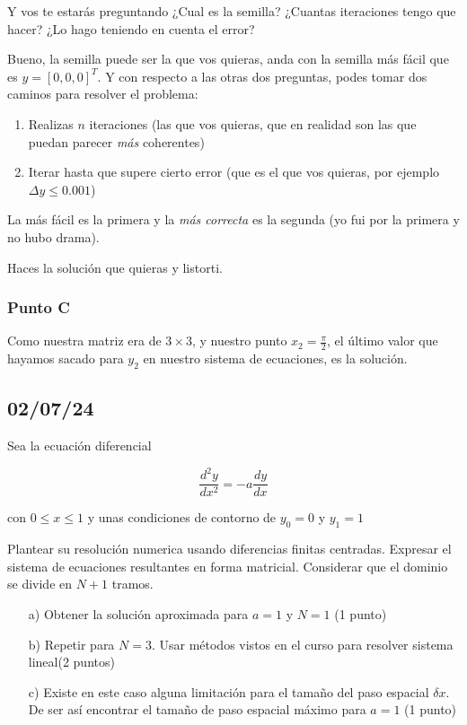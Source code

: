 Y vos te estarás preguntando ¿Cual es la semilla? ¿Cuantas iteraciones tengo que hacer? ¿Lo hago teniendo en cuenta el error? 

Bueno, la semilla puede ser la que vos quieras, anda con la semilla más fácil que es  $y = [0,0,0]^T$. Y con respecto a las otras dos preguntas, podes tomar dos caminos para resolver el problema: 

\begin{enumerate}
    \item {Realizas $n$ iteraciones (las que vos quieras, que en realidad son las que puedan parecer \textit{más} coherentes)}
    \item {Iterar hasta que supere cierto error (que es el que vos quieras, por ejemplo $\Delta y \leq 0.001$)}
\end{enumerate}

La más fácil es la primera y la \textit{más correcta} es la segunda (yo fui por la primera y no hubo drama).

Haces la solución que quieras y listorti. 


\subsubsection{Punto C}

Como nuestra matriz era de $3 \times 3 $, y nuestro punto $x_2 = \frac{\pi}{2}$, el último valor que hayamos sacado para $y_2$ en nuestro sistema de ecuaciones, es la solución. 

\subsection{02/07/24}

Sea la ecuación diferencial

$$\frac{d^2y}{dx^2} = -a\frac{dy}{dx}$$

con $0 \leq x \leq 1$ y unas condiciones de contorno de $y_0 = 0$ y $y_1 = 1$

Plantear su resolución numerica usando diferencias finitas centradas. Expresar el sistema de ecuaciones resultantes en forma matricial. Considerar que el dominio se divide en $N + 1$ tramos.

\begin{enumerate}
    \item[a)] Obtener la solución aproximada para $a = 1$ y $N = 1$ (1 punto)
    \item[b)] Repetir para $N = 3$. Usar métodos vistos en el curso para resolver sistema lineal(2 puntos)
    \item[c)] Existe en este caso alguna limitación para el tamaño del paso espacial $\delta x$. De ser así encontrar el tamaño de paso espacial máximo para $a = 1$ (1 punto)
\end{enumerate}

